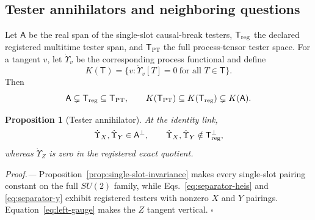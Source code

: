 \documentclass[aps,prl,onecolumn,superscriptaddress,nofootinbib]{revtex4-2}
\newcommand{\PT}{\mathrm{PT}}
\newtheorem{proposition}{Proposition}
\begin{document}
\subsection{Tester annihilators and neighboring questions}

Let $\mathsf A$ be the real span of the single-slot causal-break testers, $\mathsf T_{\rm reg}$ the declared registered multitime tester span, and $\mathsf T_{\PT}$ the full process-tensor tester space.  For a tangent $v$, let $\dot\Upsilon_v$ be the corresponding process functional and define
\begin{equation}
 K(\mathsf T)=\{v:\dot\Upsilon_v[T]=0\ \text{for all }T\in\mathsf T\}.
 \label{eq:tester-kernel}
\end{equation}
Then
\begin{equation}
 \mathsf A\subsetneq\mathsf T_{\rm reg}\subseteq\mathsf T_{\PT},
 \qquad
 K(\mathsf T_{\PT})\subseteq K(\mathsf T_{\rm reg})\subsetneq K(\mathsf A).
 \label{eq:tester-inclusions}
\end{equation}

\begin{proposition}[Tester annihilator]
\label{prop:annihilator}
At the identity link,
\begin{equation}
 \dot\Upsilon_X,\dot\Upsilon_Y\in\mathsf A^\perp,
 \qquad
 \dot\Upsilon_X,\dot\Upsilon_Y\notin\mathsf T_{\rm reg}^\perp,
 \label{eq:annihilator}
\end{equation}
whereas $\dot\Upsilon_Z$ is zero in the registered exact quotient.
\end{proposition}

\emph{Proof.---}
Proposition~\ref{prop:single-slot-invariance} makes every single-slot pairing constant on the full $SU(2)$ family, while Eqs.~\eqref{eq:separator-heis} and \eqref{eq:separator-y} exhibit registered testers with nonzero $X$ and $Y$ pairings.  Equation~\eqref{eq:left-gauge} makes the $Z$ tangent vertical. \hfill$\square$
\end{document}
